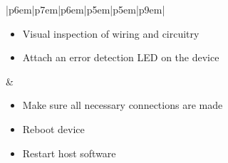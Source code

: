 \documentclass{article}
\begin{document}
\begin{table}[H]
\begin{tabular}{|p{6em}|p{7em}|p{6em}|p{5em}|p{5em}|p{9em}|}
\begin{minipage}[t]{\linewidth}
\begin{itemize}[nosep, wide=0pt, leftmargin=*, after=\strut]
					\item Visual inspection of wiring and circuitry
					\item Attach an error detection LED on the device
				\end{itemize}
			\end{minipage}                                                                                  &
			\begin{minipage}[t]{\linewidth}
				\begin{itemize}[nosep, wide=0pt, leftmargin=*, after=\strut]
					\item Make sure all necessary connections are made
					\item Reboot device
					\item Restart host software
				\end{itemize}
			\end{minipage}
			\tabularnewline{}
		\end{tabular}
	\end{table}
	
\end{document}
